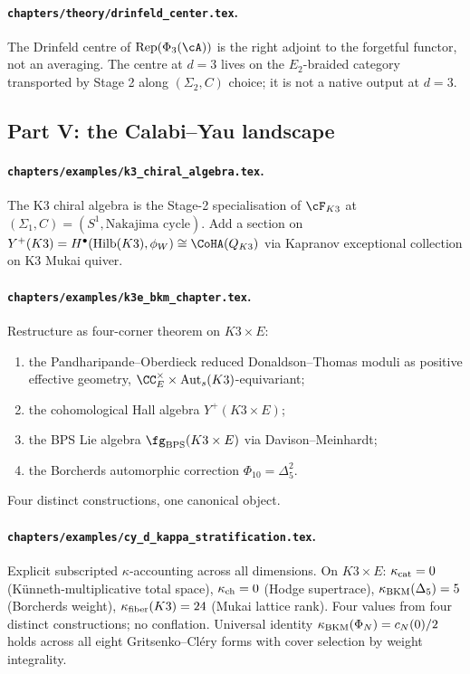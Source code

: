 \paragraph{\texttt{chapters/theory/drinfeld\_center.tex}.} The
Drinfeld centre of $\mathrm{Rep}(\Phi_3(\cA))$ is the right adjoint
to the forgetful functor, not an averaging. The centre at $d = 3$
lives on the $E_2$-braided category transported by Stage 2
along $(\Sigma_2, C)$ choice; it is not a native output at $d = 3$.

\subsection*{Part V: the Calabi--Yau landscape}

\paragraph{\texttt{chapters/examples/k3\_chiral\_algebra.tex}.} The
K3 chiral algebra is the Stage-2 specialisation of $\cF_{K3}$ at
$(\Sigma_1, C) = (S^1, \text{Nakajima cycle})$. Add a section on
$Y^+(K3) = H^\bullet(\mathrm{Hilb}(K3), \phi_W) \cong \CoHA(Q_{K3})$
via Kapranov exceptional collection on K3 Mukai quiver.

\paragraph{\texttt{chapters/examples/k3e\_bkm\_chapter.tex}.}
Restructure as four-corner theorem on $K3 \times E$:
\begin{enumerate}[label=(\roman*)]
\item the Pandharipande--Oberdieck reduced Donaldson--Thomas moduli
as positive effective geometry, $\CC^\times_E \times \mathrm{Aut}_s(K3)$-equivariant;
\item the cohomological Hall algebra $Y^+(K3 \times E)$;
\item the BPS Lie algebra $\fg_{\mathrm{BPS}}(K3 \times E)$ via
Davison--Meinhardt;
\item the Borcherds automorphic correction $\Phi_{10} = \Delta_5^2$.
\end{enumerate}
Four distinct constructions, one canonical object.

\paragraph{\texttt{chapters/examples/cy\_d\_kappa\_stratification.tex}.}
Explicit subscripted $\kappa$-accounting across all dimensions.
On $K3 \times E$: $\kappa_{\mathrm{cat}} = 0$ (K\"unneth-multiplicative total
space), $\kappa_{\mathrm{ch}} = 0$ (Hodge supertrace), $\kappa_{\mathrm{BKM}}(\Delta_5) = 5$
(Borcherds weight), $\kappa_{\mathrm{fiber}}(K3) = 24$ (Mukai lattice rank).
Four values from four distinct constructions; no conflation.
Universal identity $\kappa_{\mathrm{BKM}}(\Phi_N) = c_N(0)/2$ holds across all
eight Gritsenko--Cl\'ery forms with cover selection by weight
integrality.

